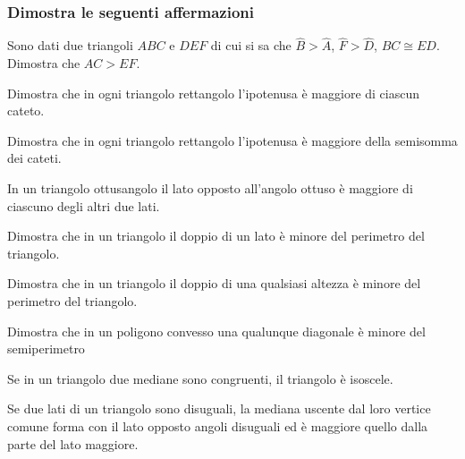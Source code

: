 \begin{multicols}{2}

\subsubsection*{Dimostra le seguenti affermazioni}

\begin{esercizio}
\label{ese:3.80}
Sono dati due triangoli $ABC$ e $DEF$ di cui si sa che $\widehat{B}>\widehat{A}$, $\widehat{F}>\widehat{D}$, $BC\cong ED$. Dimostra che $AC>EF$.
\end{esercizio}

\begin{esercizio}
\label{ese:3.81}
Dimostra che in ogni triangolo rettangolo l'ipotenusa è maggiore di ciascun cateto.
\end{esercizio}

\begin{esercizio}
\label{ese:3.82}
Dimostra che in ogni triangolo rettangolo l'ipotenusa è maggiore della semisomma dei cateti.
\end{esercizio}

\begin{esercizio}
\label{ese:3.83}
In un triangolo ottusangolo il lato opposto all'angolo ottuso è maggiore di ciascuno degli altri due lati.
\end{esercizio}

\begin{esercizio}
\label{ese:3.84}
Dimostra che in un triangolo il doppio di un lato è minore del perimetro del triangolo. 
\end{esercizio}

\begin{esercizio}
\label{ese:3.85}
Dimostra che in un triangolo il doppio di una qualsiasi altezza è minore del perimetro del triangolo. 
\end{esercizio}

\begin{esercizio}
\label{ese:3.86}
Dimostra che in un poligono convesso una qualunque diagonale è minore del semiperimetro
\end{esercizio}

\begin{esercizio}
\label{ese:3.87}
Se in un triangolo due mediane sono congruenti, il triangolo è isoscele. 
\end{esercizio}

\begin{esercizio}
\label{ese:3.88}
Se due lati di un triangolo sono disuguali, la mediana uscente dal loro vertice comune forma con il lato opposto angoli disuguali ed è maggiore quello dalla parte del lato maggiore.
\end{esercizio}


\end{multicols}
